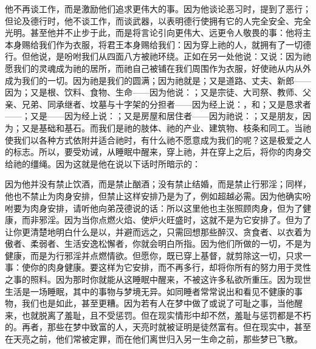 他不再谈工作，而是激励他们追求更伟大的事。因为他谈论恶习时，提到了恶行；但论及德行时，他不谈工作，而谈武器，以表明德行使拥有它的人完全安全、完全光明。甚至他并不止步于此，而是将言论引向更伟大、远更令人敬畏的事：他将主本身赐给我们作为衣服，将君王本身赐给我们：因为穿上祂的人，就拥有了一切德行。但他说，是吩咐我们从四面八方被祂环绕。正如在另一处他说：又说：因为祂愿我们的灵魂成为祂的居所，而祂自己被铺在我们周围作为衣服，好使祂从内从外成为我们的一切。因为祂是我们的圆满；因为祂就是；又是道路、丈夫、新郎——因为；又是根、饮料、食物、生命——因为他说：；又是宗徒、大司祭、教师、父亲、兄弟、同承继者、坟墓与十字架的分担者——因为经上说：，和；又是恳求者——；又是——因为经上说：；又是房屋和居住者——因为祂说：；又是朋友，因为；又是基础和基石。而我们是祂的肢体、祂的产业、建筑物、枝条和同工。当祂使我们以各种方式依附并适合祂时，有什么祂不愿意成为我们的呢？这是极爱之人的标志。所以，要受劝诫，从睡眠中醒来，穿上祂，并在穿上之后，将你的肉身交给祂的缰绳。因为这就是他在说以下话时所暗示的：\par

因为他并没有禁止饮酒，而是禁止酗酒；没有禁止结婚，而是禁止行邪淫；同样，他也不禁止为肉身安排，但禁止这样安排乃是为了，例如超越必需。因为他确实吩咐要为肉身安排，请听他向弟茂德说的话：所以这里他也主张照顾肉身，但为了健康，而非邪淫。因为当你点燃火焰、使炉火旺盛时，这就不是为它安排了。但为了让你更清楚地明白什么是以，并避而远之，只需回想那些醉汉、贪食者、以衣着为傲者、柔弱者、生活安逸松懈者，你就会明白所指。因为他们所做的一切，不是为健康，而是为行邪淫并点燃情欲。但愿你，既已穿上基督，就剪除这一切，只求一事：使你的肉身健康。要这样为它安排，而不再多行，却将你所有的努力用于灵性之事的照料。因为那时你就能从这睡眠中醒来，不被这许多私欲所重压。因为现世生活是一场睡眠，其中的事物与梦境无异。如同睡者常常说出和看见不健康的事物，我们也是如此，甚至更糟。因为若有人在梦中做了或说了可耻之事，当他醒来，也就脱离了羞耻，且不受惩罚。但在现实情形中却不然，羞耻与惩罚都是不朽的。再者，那些在梦中致富的人，天亮时就被证明是徒然富有。但在现实中，甚至在天亮之前，他们常被定罪，而在他们离世归入另一生命之前，那些梦已飞散。\par

